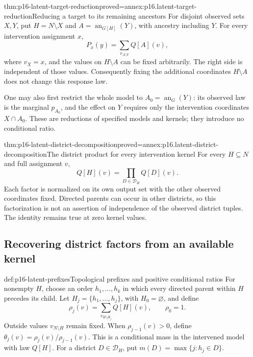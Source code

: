 \begin{hbcorollary}{thm:p16-latent-target-reduction}{proved=annex:p16.latent-target-reduction}{Reducing a target to its remaining ancestors}
For disjoint observed sets \(X,Y\), put \(H=N\setminus X\)
and \(A=\operatorname{an}_{G[H]}(Y)\), with ancestry including
\(Y\). For every intervention assignment \(x\),
\[
 P_x(y)=\sum_{v_{A\setminus Y}}Q[A](v),
\]
where \(v_X=x\), and the values on \(H\setminus A\) can
be fixed arbitrarily. The right side is independent of those values.
Consequently fixing the additional coordinates \(H\setminus A\)
does not change this response law.

One may also first restrict the whole model to
\(A_0=\operatorname{an}_G(Y)\): its observed law is
the marginal \(p_{A_0}\), and the effect on \(Y\) requires only the
intervention coordinates \(X\cap A_0\). These are reductions
of specified models and kernels; they introduce no conditional ratio.
\end{hbcorollary}

\begin{hbtheorem}{thm:p16-latent-district-decomposition}{proved=annex:p16.latent-district-decomposition}{The district product for every intervention kernel}
For every \(H\subseteq N\) and full assignment \(v\),
\[
 Q[H](v)=\prod_{D\in\mathcal D_H}Q[D](v).
\]
Each factor is normalized on its own output set with the other
observed coordinates fixed. Directed parents can occur in other
districts, so this factorization is not an assertion of independence
of the observed district tuples. The identity remains true at zero
kernel values.
\end{hbtheorem}

\subsection{Recovering district factors from an available kernel}

\begin{hbdefinition}{def:p16-latent-prefixes}{Topological prefixes and positive conditional ratios}
For nonempty \(H\), choose an order \(h_1,\ldots,h_k\) in
which every directed parent within \(H\) precedes its child.
Let \(H_j=\{h_1,\ldots,h_j\}\), with \(H_0=\varnothing\),
and define
\[
 \rho_j(v)=\sum_{v_{H\setminus H_j}}Q[H](v),
 \qquad \rho_0=1.
\]
Outside values \(v_{N\setminus H}\) remain fixed. When
\(\rho_{j-1}(v)>0\), define
\(\theta_j(v)=\rho_j(v)/\rho_{j-1}(v)\).
This is a conditional mass in the intervened model with law \(Q[H]\).
For a district \(D\in\mathcal D_H\), put
\(m(D)=\max\{j:h_j\in D\}\).
\end{hbdefinition}

